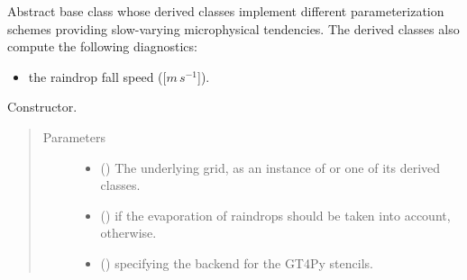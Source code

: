 \documentclass[letterpaper,10pt,english]{sphinxmanual}
\begin{document}
\begin{fulllineitems}
\label{\detokenize{api:tasmania.parameterizations.slow_tendencies.SlowTendencyMicrophysics}}
Abstract base class whose derived classes implement different parameterization schemes providing
slow-varying microphysical tendencies. The derived classes also compute the following diagnostics:
\begin{itemize}
\item {} 
the raindrop fall speed ({[}\(m \, s^{-1}\){]}).

\end{itemize}

\begin{fulllineitems}
\label{\detokenize{api:tasmania.parameterizations.slow_tendencies.SlowTendencyMicrophysics.__init__}}
Constructor.
\begin{quote}\begin{description}
\item[{Parameters}] \leavevmode\begin{itemize}
\item {} 
 () \textendash{} The underlying grid, as an instance of {\hyperref[\detokenize{api:tasmania.grids.grid_xyz.GridXYZ}]{}} or one of its derived classes.

\item {} 
 () \textendash{}  if the evaporation of raindrops should be taken into account,  otherwise.

\item {} 
 () \textendash{}  specifying the backend for the GT4Py stencils.

\end{itemize}

\end{description}\end{quote}


\end{fulllineitems}
\end{fulllineitems}
\end{document}
